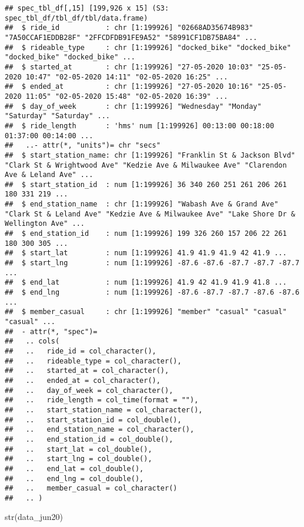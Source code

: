 \documentclass[
]{article}
\newenvironment{Shaded}{\begin{snugshade}}{\end{snugshade}}
\newcommand{\FunctionTok}[1]{\textcolor[rgb]{0.00,0.00,0.00}{#1}}
\newcommand{\NormalTok}[1]{#1}
\begin{document}
\begin{verbatim}
## spec_tbl_df[,15] [199,926 x 15] (S3: spec_tbl_df/tbl_df/tbl/data.frame)
##  $ ride_id           : chr [1:199926] "02668AD35674B983" "7A50CCAF1EDDB28F" "2FFCDFDB91FE9A52" "58991CF1DB75BA84" ...
##  $ rideable_type     : chr [1:199926] "docked_bike" "docked_bike" "docked_bike" "docked_bike" ...
##  $ started_at        : chr [1:199926] "27-05-2020 10:03" "25-05-2020 10:47" "02-05-2020 14:11" "02-05-2020 16:25" ...
##  $ ended_at          : chr [1:199926] "27-05-2020 10:16" "25-05-2020 11:05" "02-05-2020 15:48" "02-05-2020 16:39" ...
##  $ day_of_week       : chr [1:199926] "Wednesday" "Monday" "Saturday" "Saturday" ...
##  $ ride_length       : 'hms' num [1:199926] 00:13:00 00:18:00 01:37:00 00:14:00 ...
##   ..- attr(*, "units")= chr "secs"
##  $ start_station_name: chr [1:199926] "Franklin St & Jackson Blvd" "Clark St & Wrightwood Ave" "Kedzie Ave & Milwaukee Ave" "Clarendon Ave & Leland Ave" ...
##  $ start_station_id  : num [1:199926] 36 340 260 251 261 206 261 180 331 219 ...
##  $ end_station_name  : chr [1:199926] "Wabash Ave & Grand Ave" "Clark St & Leland Ave" "Kedzie Ave & Milwaukee Ave" "Lake Shore Dr & Wellington Ave" ...
##  $ end_station_id    : num [1:199926] 199 326 260 157 206 22 261 180 300 305 ...
##  $ start_lat         : num [1:199926] 41.9 41.9 41.9 42 41.9 ...
##  $ start_lng         : num [1:199926] -87.6 -87.6 -87.7 -87.7 -87.7 ...
##  $ end_lat           : num [1:199926] 41.9 42 41.9 41.9 41.8 ...
##  $ end_lng           : num [1:199926] -87.6 -87.7 -87.7 -87.6 -87.6 ...
##  $ member_casual     : chr [1:199926] "member" "casual" "casual" "casual" ...
##  - attr(*, "spec")=
##   .. cols(
##   ..   ride_id = col_character(),
##   ..   rideable_type = col_character(),
##   ..   started_at = col_character(),
##   ..   ended_at = col_character(),
##   ..   day_of_week = col_character(),
##   ..   ride_length = col_time(format = ""),
##   ..   start_station_name = col_character(),
##   ..   start_station_id = col_double(),
##   ..   end_station_name = col_character(),
##   ..   end_station_id = col_double(),
##   ..   start_lat = col_double(),
##   ..   start_lng = col_double(),
##   ..   end_lat = col_double(),
##   ..   end_lng = col_double(),
##   ..   member_casual = col_character()
##   .. )
\end{verbatim}

\begin{Shaded}
\begin{Highlighting}[]
\FunctionTok{str}\NormalTok{(data\_jun20)}
\end{Highlighting}
\end{Shaded}
\end{document}
